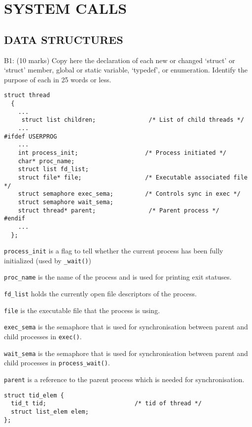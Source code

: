 \section{SYSTEM CALLS}

\subsection*{DATA STRUCTURES}

\noindent B1: (10 marks)
Copy here the declaration of each new or changed `struct' or
`struct' member, global or static variable, `typedef', or
enumeration.  Identify the purpose of each in 25 words or less.

\begin{verbatim}
struct thread
  {
    ...
     struct list children;               /* List of child threads */
    ...
#ifdef USERPROG
    ...
    int process_init;                   /* Process initiated */
    char* proc_name;
    struct list fd_list;
    struct file* file;                  /* Executable associated file */
    struct semaphore exec_sema;         /* Controls sync in exec */
    struct semaphore wait_sema;
    struct thread* parent;               /* Parent process */
#endif
    ...    
  };
\end{verbatim}

\texttt{process\_init} is a flag to tell whether the current process has been fully initialized (used by \texttt{\process_wait()})

\texttt{proc\_name} is the name of the process and is used for printing exit statuses.

\texttt{fd\_list} holds the currently open file descriptors of the process.

\texttt{file} is the executable file that the process is using.

\texttt{exec\_sema} is the semaphore that is used for synchronisation between parent and child processes in \texttt{exec()}.

\texttt{wait\_sema} is the semaphore that is used for synchronisation between parent and child processes in \texttt{process\_wait()}.

\texttt{parent} is a reference to the parent process which is needed for synchronisation.


\begin{verbatim}
struct tid_elem {
  tid_t tid;                         /* tid of thread */
  struct list_elem elem;
};
\end{verbatim}

